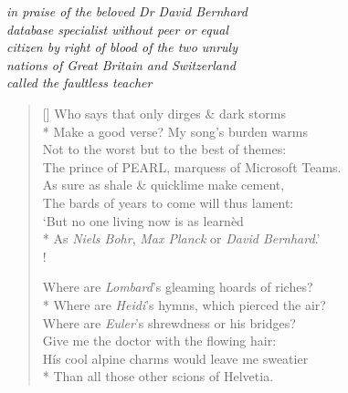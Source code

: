 \begin{center}
    \textit{in praise of the beloved Dr David Bernhard}\\
    \textit{database specialist without peer or equal}\\
    \textit{citizen by right of blood of the two unruly}\\
    \textit{nations of Great Britain and Switzerland}\\
    \textit{called the faultless teacher}
\end{center}

\bigskip

\settowidth{\versewidth}{His cool alpine charms would leave me sweatier}
\begin{verse}[\versewidth]
Who says that only dirges \& dark storms\\*
Make a good verse? My song's burden warms\\
Not to the worst but to the best of themes:\\
The prince of PEARL, marquess of Microsoft Teams.\\
As sure as shale \& quicklime make cement,\\
The bards of years to come will thus lament:\\
`But no one living now is  as learn\`ed\\*
As \textit{Niels Bohr}, \textit{Max Planck} or \textit{David Bernhard}.'\\!

Where are \textit{Lombard}'s gleaming hoards of riches?\\*
\vin Where are \textit{Heidi}'s hymns, which pierced the air?\\
Where are \textit{Euler}'s shrewdness or his bridges?\\
\vin Give me the doctor with the flowing hair:\\
H\'is cool alpine charms would leave me sweatier\\*
Than all those other scions of Helvetia.
\end{verse}
